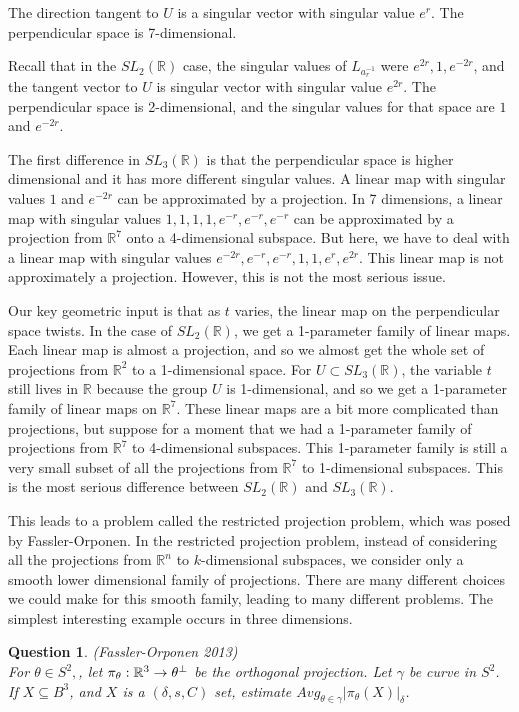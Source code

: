 \documentclass[12pt]{amsart}
\newtheorem{question}[theorem]{Question}
\newcommand{\RR}{\mathbb{R}}
\begin{document}
The direction tangent to $U$ is a singular vector with singular value $e^r$.   The perpendicular space is 7-dimensional.   

Recall that in the $SL_2(\RR)$ case, the singular values of $L_{a_r^{-1}}$ were $e^{2r},  1,  e^{-2r}$,  and the tangent vector to $U$ is singular vector with singular value $e^{2r}$.   The perpendicular space is 2-dimensional,  and the singular values for that space are $1$ and $e^{-2r}$.

The first difference in $SL_3(\RR)$ is that the perpendicular space is higher dimensional and it has more different singular values.   A linear map with singular values $1$ and $e^{-2r}$ can be approximated by a projection.   In 7 dimensions,  a linear map with singular values $1,1,1,1, e^{-r}, e^{-r}, e^{-r}$ can be approximated by a projection from $\RR^7$ onto a 4-dimensional subspace.   But here, we have to deal with a linear map with singular values $e^{-2r}, e^{-r}, e^{-r}, 1,1,e^r, e^{2r}$.   This linear map is not approximately a projection.   However,  this is not the most serious issue.

Our key geometric input is that as $t$ varies,  the linear map on the perpendicular space twists.   In the case of $SL_2(\RR)$,  we get a 1-parameter family of linear maps.  Each linear map is almost a projection, and so we almost get the whole set of projections from $\RR^2$ to a 1-dimensional space.   For  $U \subset SL_3(\RR)$,  the variable $t$ still lives in $\RR$ because the group $U$ is 1-dimensional,  and so we get a 1-parameter family of linear maps on $\RR^7$.   These linear maps are a bit more complicated than projections,  but suppose for a moment that we had a 1-parameter family of projections from $\RR^7$ to 4-dimensional subspaces.   This 1-parameter family is still a very small subset of all the projections from $\RR^7$ to 1-dimensional subspaces.   This is the most serious difference between $SL_2(\RR)$ and $SL_3(\RR)$.   

This leads to a problem called the restricted projection problem, which was posed by Fassler-Orponen.    In the restricted projection problem, instead of considering all the projections from $\RR^n$ to $k$-dimensional subspaces,  we consider only a smooth lower dimensional family of projections.  There are many different choices we could make for this smooth family,  leading to many different problems.   The simplest interesting example occurs in three dimensions.

\begin{question}(Fassler-Orponen 2013)\\
For $\theta \in S^2,$, let $ \pi_\theta: \mathbb{R}^3 \rightarrow \theta^\perp$ be the orthogonal projection.
Let $\gamma$ be curve in $S^2$. If $X \subseteq B^3$, and $X$ is a $(\delta, s, C)$ set,  estimate $Avg_{\theta\in \gamma}|\pi_\theta(X)|_\delta$. 
\end{question}
\end{document}
